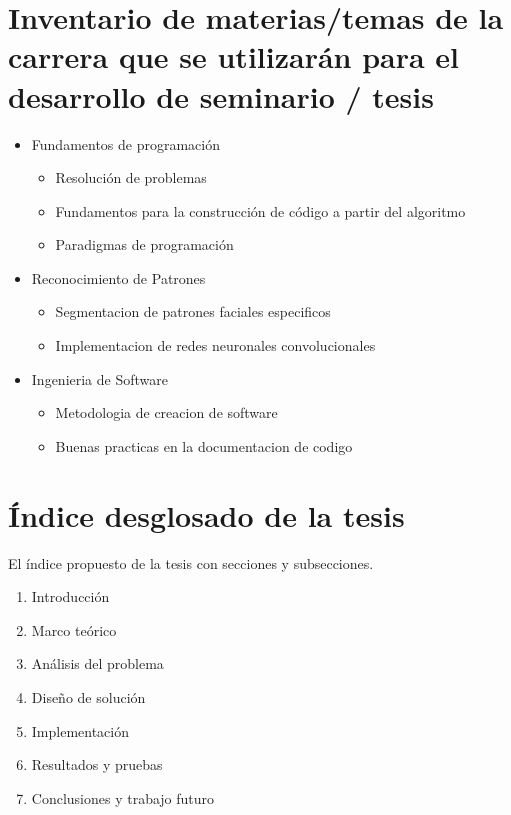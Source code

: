 \documentclass[letterpaper,12pt,oneside]{article}
\begin{document}
\section{Inventario de materias/temas de la carrera que se utilizarán para el desarrollo de seminario / tesis}


\begin{itemize}
    \item Fundamentos de programación
    \begin{itemize}
        \item Resolución de problemas 
        \item Fundamentos para la construcción de código a partir del algoritmo
        \item Paradigmas de programación
    \end{itemize}
    \item Reconocimiento  de Patrones
    \begin{itemize}
        \item Segmentacion de patrones faciales especificos 
        \item Implementacion de redes neuronales convolucionales
    \end{itemize}
    \item Ingenieria de Software
    \begin{itemize}
        \item Metodologia de creacion de software 
        \item Buenas practicas en la documentacion de codigo
    \end{itemize}
    
\end{itemize}

\section{Índice desglosado de la tesis}
El índice propuesto de la tesis con secciones y subsecciones.

\begin{enumerate}
    \item Introducción
    \item Marco teórico
    \item Análisis del problema
    \item Diseño de solución
    \item Implementación
    \item Resultados y pruebas
    \item Conclusiones y trabajo futuro
\end{enumerate}
\end{document}
